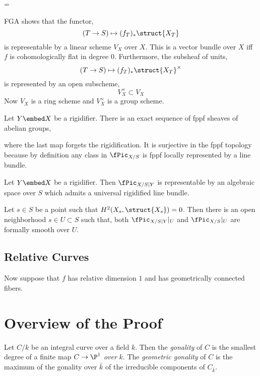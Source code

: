 =\documentclass[12pt]{article}
\begin{document}
FGA shows that the functor,
\[ (T \to S) \mapsto (f_T)_* \struct{X_T} \]
is representable by a linear scheme $V_X$ over $X$. This is a vector bundle over $X$ iff $f$ is cohomologically flat in degree $0$. Furthermore, the subsheaf of units,
\[ (T \to S) \mapsto (f_T)_* \struct{X_T}^\times \]
is represented by an open subscheme,
\[ V_X^\times \subset V_X \]
Now $V_X$ is a ring scheme and $V_X^\times$ is a group scheme. 

\begin{prop}
Let $Y \embed X$ be a rigidifier. 
There is an exact sequence of fppf sheaves of abelian groups,
\begin{center}
\end{center}
where the last map forgets the rigidification. It is surjective in the fppf topology because by definition any class in $\fPic_{X/S}$ is fppf locally represented by a line bundle.
\end{prop}

\begin{theorem}[8.3.3]
Let $Y \embed X$ be a rigidifier. Then $\fPic_{X/S|Y}$ is representable by an algebraic space over $S$ which admits a universal rigidified line bundle.
\end{theorem}

\begin{prop}
Let $s \in S$ be a point such that $H^2(X_s, \struct{X_s}) = 0$. Then there is an open neighborhood $s \in U \subset S$ such that, both $\fPic_{X/S|Y}|_U$ and $\fPic_{X/S}|_U$ are formally smooth over $U$.
\end{prop}

\subsection{Relative Curves}

Now suppose that $f$ has relative dimension $1$ and has geometrically connected fibers.


\section{Overview of the Proof}

\newcommand{\gon}{\mathrm{gon}}

\begin{defn}
Let $C/k$ be an integral curve over a field $k$. Then the \textit{gonality} of $C$ is the smallest degree of a finite map $C \to \P^1$ \textit{over} $k$. The \textit{geometric gonality} of $C$ is the maximum of the gonality over $\bar{k}$ of the irreducible components of $C_{\bar{k}}$. 
\end{defn}
\end{document}
